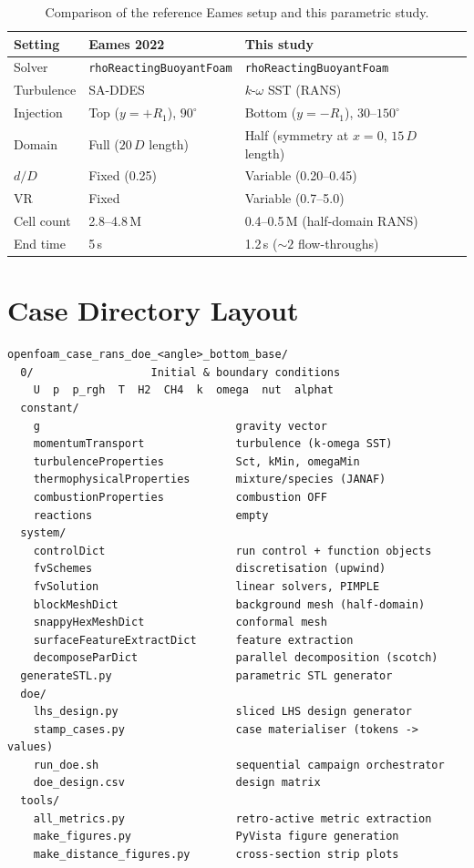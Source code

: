 \documentclass[12pt,a4paper]{report}
\begin{document}
\begin{table}[H]
\centering
\caption{Comparison of the reference Eames setup and this parametric study.}
\label{tab:comparison}
\small
\begin{tabularx}{\textwidth}{@{}lXX@{}}
\toprule
\textbf{Setting} & \textbf{Eames 2022} & \textbf{This study} \\
\midrule
Solver & \texttt{rhoReactingBuoyantFoam} & \texttt{rhoReactingBuoyantFoam} \\
Turbulence & SA-DDES & $k$-$\omega$ SST (RANS) \\
Injection & Top ($y = +R_1$), $90^{\circ}$ & Bottom ($y = -R_1$), $30$--$150^{\circ}$ \\
Domain & Full ($20\,D$ length) & Half (symmetry at $x = 0$, $15\,D$ length) \\
$d/D$ & Fixed (0.25) & Variable (0.20--0.45) \\
VR & Fixed & Variable (0.7--5.0) \\
Cell count & 2.8--4.8\,M & 0.4--0.5\,M (half-domain RANS) \\
End time & 5\,s & 1.2\,s ($\sim 2$ flow-throughs) \\
\bottomrule
\end{tabularx}
\end{table}


\section{Case Directory Layout}

\begin{lstlisting}[language={},numbers=none,frame=none,
  backgroundcolor=\color{white}]
openfoam_case_rans_doe_<angle>_bottom_base/
  0/                  Initial & boundary conditions
    U  p  p_rgh  T  H2  CH4  k  omega  nut  alphat
  constant/
    g                              gravity vector
    momentumTransport              turbulence (k-omega SST)
    turbulenceProperties           Sct, kMin, omegaMin
    thermophysicalProperties       mixture/species (JANAF)
    combustionProperties           combustion OFF
    reactions                      empty
  system/
    controlDict                    run control + function objects
    fvSchemes                      discretisation (upwind)
    fvSolution                     linear solvers, PIMPLE
    blockMeshDict                  background mesh (half-domain)
    snappyHexMeshDict              conformal mesh
    surfaceFeatureExtractDict      feature extraction
    decomposeParDict               parallel decomposition (scotch)
  generateSTL.py                   parametric STL generator
  doe/
    lhs_design.py                  sliced LHS design generator
    stamp_cases.py                 case materialiser (tokens -> values)
    run_doe.sh                     sequential campaign orchestrator
    doe_design.csv                 design matrix
  tools/
    all_metrics.py                 retro-active metric extraction
    make_figures.py                PyVista figure generation
    make_distance_figures.py       cross-section strip plots
\end{lstlisting}
\end{document}
